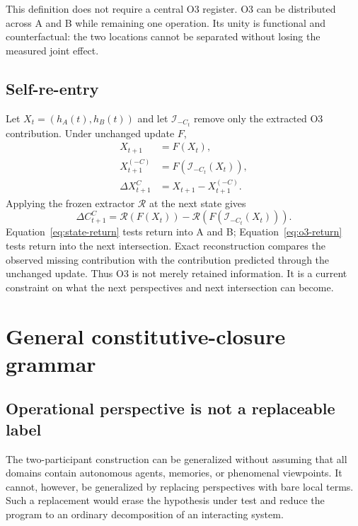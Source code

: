 \documentclass[11pt,a4paper]{article}
\begin{document}
This definition does not require a central O3 register. O3 can be distributed across A and B while remaining one operation. Its unity is functional and counterfactual: the two locations cannot be separated without losing the measured joint effect.

\subsection{Self-re-entry}

Let $X_t=(h_A(t),h_B(t))$ and let $\mathcal I_{-C_t}$ remove only the extracted O3 contribution. Under unchanged update $F$,
\begin{align}
 X_{t+1}&=F(X_t),\\
 X_{t+1}^{(-C)}&=F(\mathcal I_{-C_t}(X_t)),\\
 \Delta X_{t+1}^{C}&=X_{t+1}-X_{t+1}^{(-C)}.
 \label{eq:state-return}
\end{align}
Applying the frozen extractor $\mathcal R$ at the next state gives
\begin{equation}
 \Delta C_{t+1}^{C}
 =\mathcal R(F(X_t))-\mathcal R(F(\mathcal I_{-C_t}(X_t))).
 \label{eq:o3-return}
\end{equation}
Equation~\eqref{eq:state-return} tests return into A and B; Equation~\eqref{eq:o3-return} tests return into the next intersection. Exact reconstruction compares the observed missing contribution with the contribution predicted through the unchanged update. Thus O3 is not merely retained information. It is a current constraint on what the next perspectives and next intersection can become.

\section{General constitutive-closure grammar}

\subsection{Operational perspective is not a replaceable label}

The two-participant construction can be generalized without assuming that all domains contain autonomous agents, memories, or phenomenal viewpoints. It cannot, however, be generalized by replacing perspectives with bare local terms. Such a replacement would erase the hypothesis under test and reduce the program to an ordinary decomposition of an interacting system.
\end{document}
